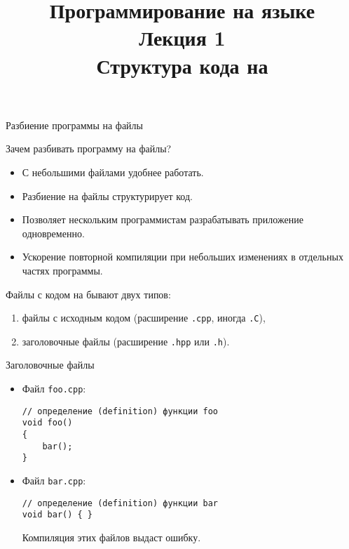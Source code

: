 \documentclass{beamer}
\title{{\bf Программирование на языке \langcpp\protect\\Лекция
1\protect\vspace{1em}\\}Структура кода на \langcpp}
\begin{document}
\begin{frame} 
  \titlepage
\end{frame}

\begin{frame}[fragile]{Разбиение программы на файлы}

Зачем разбивать программу на файлы? 
\begin{itemize}
    \item С небольшими файлами удобнее работать.
    \item Разбиение на файлы структурирует код.
    \item Позволяет нескольким программистам разрабатывать 
        приложение одновременно.
    \item Ускорение повторной компиляции при небольших 
        изменениях в отдельных частях программы. 
        
\end{itemize}
    Файлы с кодом на \langcpp бывают двух типов:
    \begin{enumerate}
        \item файлы с исходным кодом (расширение \texttt{.cpp}, иногда \texttt{.C}),
        \item заголовочные файлы (расширение \texttt{.hpp} или \texttt{.h}).
    \end{enumerate}
\end{frame}

%

\begin{frame}[fragile]{Заголовочные файлы}
\begin{itemize}
    \item Файл {\tt foo.cpp}:
{\small \begin{lstlisting}
// определение (definition) функции foo
void foo()
{
    bar();
}
\end{lstlisting}}

\item Файл {\tt bar.cpp}:
\begin{lstlisting}
// определение (definition) функции bar
void bar() { }
\end{lstlisting}

Компиляция этих файлов выдаст ошибку.
\end{itemize}
\end{frame}
\end{document}
